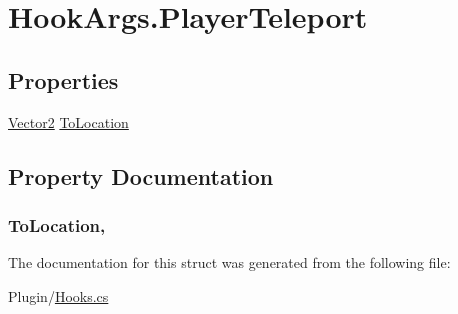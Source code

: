 \hypertarget{structOTA_1_1Plugin_1_1HookArgs_1_1PlayerTeleport}{}\section{Hook\+Args.\+Player\+Teleport}
\label{structOTA_1_1Plugin_1_1HookArgs_1_1PlayerTeleport}
\subsection*{Properties}
\begin{DoxyCompactItemize}
\item 
\hyperlink{structMicrosoft_1_1Xna_1_1Framework_1_1Vector2}{Vector2} \hyperlink{structOTA_1_1Plugin_1_1HookArgs_1_1PlayerTeleport_a5f5a723ba02027b9268eb95e2224bc46}{To\+Location}
\end{DoxyCompactItemize}


\subsection{Property Documentation}
\hypertarget{structOTA_1_1Plugin_1_1HookArgs_1_1PlayerTeleport_a5f5a723ba02027b9268eb95e2224bc46}{}
\subsubsection[{To\+Location}]{ To\+Location\hspace{0.3cm}{\ttfamily [get]}, {\ttfamily [set]}}\label{structOTA_1_1Plugin_1_1HookArgs_1_1PlayerTeleport_a5f5a723ba02027b9268eb95e2224bc46}


The documentation for this struct was generated from the following file\+:\begin{DoxyCompactItemize}
\item 
Plugin/\hyperlink{Hooks_8cs}{Hooks.\+cs}\end{DoxyCompactItemize}
